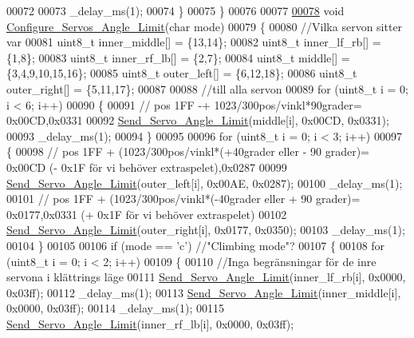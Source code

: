 \begin{DoxyCode}
00072         
00073         \_delay\_ms(1);
00074     \}
00075 \}
00076 
00077 
\hypertarget{servo___u_a_r_t_8c_source.tex_l00078}{}\hyperlink{servo___u_a_r_t_8h_ac61953255036321acac8c2e20b76d692}{00078} \textcolor{keywordtype}{void} \hyperlink{servo___u_a_r_t_8c_ac61953255036321acac8c2e20b76d692}{Configure\_Servos\_Angle\_Limit}(\textcolor{keywordtype}{char} mode)
00079 \{
00080     \textcolor{comment}{//Vilka servon sitter var }
00081     uint8\_t inner\_middle[] = \{13,14\};
00082     uint8\_t inner\_lf\_rb[] = \{1,8\};
00083     uint8\_t inner\_rf\_lb[] = \{2,7\};
00084     uint8\_t middle[] = \{3,4,9,10,15,16\};
00085     uint8\_t outer\_left[] = \{6,12,18\};
00086     uint8\_t outer\_right[] = \{5,11,17\};
00087     
00088     \textcolor{comment}{//till alla servon}
00089     \textcolor{keywordflow}{for} (uint8\_t i = 0; i < 6; i++)
00090     \{
00091         \textcolor{comment}{// pos 1FF -+ 1023/300pos/vinkl*90grader= 0x00CD,0x0331}
00092         \hyperlink{servo___u_a_r_t_8c_aae1b10368951b07e7049392da8e8160b}{Send\_Servo\_Angle\_Limit}(middle[i], 0x00CD, 0x0331); 
00093         \_delay\_ms(1);
00094     \}
00095     
00096     \textcolor{keywordflow}{for} (uint8\_t i = 0; i < 3; i++)
00097     \{
00098         \textcolor{comment}{// pos 1FF + (1023/300pos/vinkl*(+40grader eller - 90 grader)= 0x00CD (- 0x1F för vi behöver
       extraspelet),0x0287}
00099         \hyperlink{servo___u_a_r_t_8c_aae1b10368951b07e7049392da8e8160b}{Send\_Servo\_Angle\_Limit}(outer\_left[i], 0x00AE, 0x0287); 
00100         \_delay\_ms(1);
00101          \textcolor{comment}{// pos 1FF + (1023/300pos/vinkl*(-40grader eller + 90 grader)= 0x0177,0x0331 (+ 0x1F för vi
       behöver extraspelet)}
00102         \hyperlink{servo___u_a_r_t_8c_aae1b10368951b07e7049392da8e8160b}{Send\_Servo\_Angle\_Limit}(outer\_right[i], 0x0177, 0x0350);
00103         \_delay\_ms(1);
00104     \}
00105     
00106     \textcolor{keywordflow}{if} (mode == \textcolor{charliteral}{'c'}) \textcolor{comment}{//"Climbing mode"?}
00107     \{
00108         \textcolor{keywordflow}{for} (uint8\_t i = 0; i < 2; i++)
00109         \{
00110             \textcolor{comment}{//Inga begränsningar för de inre servona i klättrings läge }
00111             \hyperlink{servo___u_a_r_t_8c_aae1b10368951b07e7049392da8e8160b}{Send\_Servo\_Angle\_Limit}(inner\_lf\_rb[i], 0x0000, 0x03ff);  
00112             \_delay\_ms(1);
00113             \hyperlink{servo___u_a_r_t_8c_aae1b10368951b07e7049392da8e8160b}{Send\_Servo\_Angle\_Limit}(inner\_middle[i], 0x0000, 0x03ff); 
00114             \_delay\_ms(1);
00115             \hyperlink{servo___u_a_r_t_8c_aae1b10368951b07e7049392da8e8160b}{Send\_Servo\_Angle\_Limit}(inner\_rf\_lb[i], 0x0000, 0x03ff); 

\end{DoxyCode}
